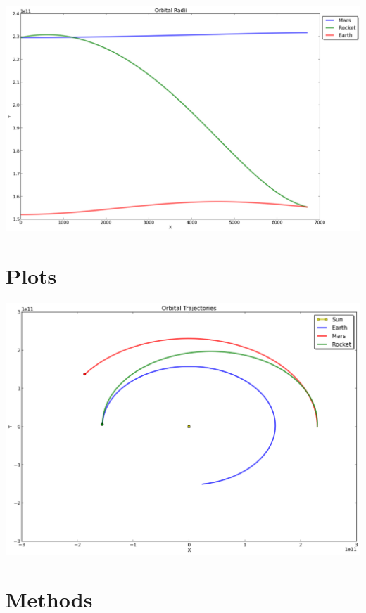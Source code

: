\documentclass[letterpaper,10pt,english]{sphinxmanual}
\begin{document}
\includegraphics{radii.png}


\section{Plots}
\label{index:plots}
\includegraphics{trajectories.png}


\section{Methods}
\label{index:module-orbital}\label{index:methods}
\end{document}
